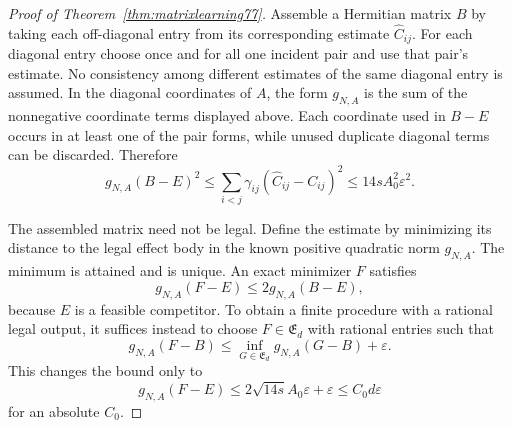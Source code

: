 \begin{proof}[Proof of Theorem~\ref{thm:matrixlearning77}]
Assemble a Hermitian matrix $B$ by taking each off-diagonal entry
from its corresponding estimate $\widehat C_{ij}$.  For each
diagonal entry choose once and for all one incident pair and use
that pair's estimate.  No consistency among different estimates of
the same diagonal entry is assumed.  In the diagonal coordinates of
$A$, the form $g_{N,A}$ is the sum of the nonnegative coordinate
terms displayed above.  Each coordinate used in $B-E$ occurs in at
least one of the pair forms, while unused duplicate diagonal terms
can be discarded.  Therefore
\begin{equation}\label{eq:matrixlearningassembly77}
 g_{N,A}(B-E)^2
 \le\sum_{i<j}
       \gamma_{ij}(\widehat C_{ij}-C_{ij})^2
 \le14sA_0^2\varepsilon^2.
\end{equation}

The assembled matrix need not be legal.  Define the estimate by
minimizing its distance to the legal effect body in the known
positive quadratic norm $g_{N,A}$.  The minimum is attained and is
unique.  An exact minimizer $F$ satisfies
\[
 g_{N,A}(F-E)\le2g_{N,A}(B-E),
\]
because $E$ is a feasible competitor.  To obtain a finite procedure
with a rational legal output, it suffices instead to choose
$F\in\mathfrak E_d$ with rational entries such that
\begin{equation}\label{eq:matrixlearningprojection77}
 g_{N,A}(F-B)
 \le\inf_{G\in\mathfrak E_d}g_{N,A}(G-B)+\varepsilon.
\end{equation}
This changes the bound only to
\begin{equation}\label{eq:matrixlearningprojectionerror77}
 g_{N,A}(F-E)
 \le2\sqrt{14s}A_0\varepsilon+\varepsilon
 \le C_0d\varepsilon
\end{equation}
for an absolute $C_0$.


\end{proof}
